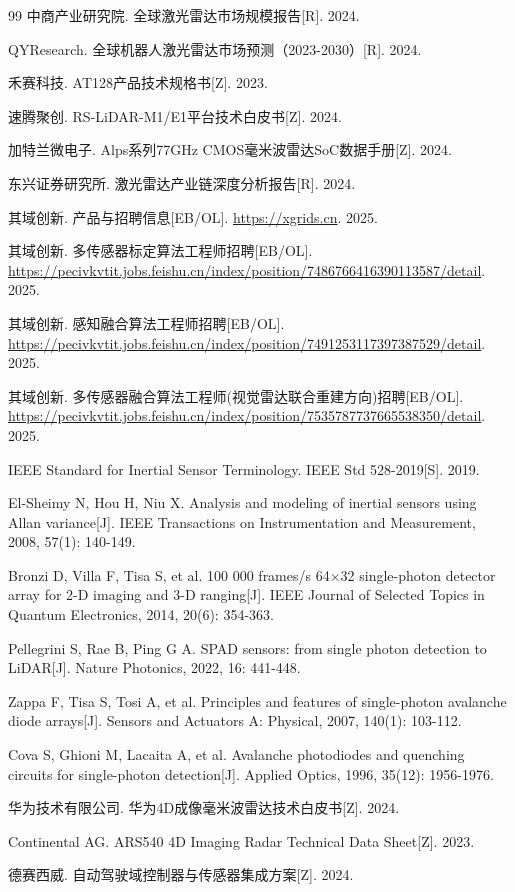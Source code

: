 \documentclass[12pt,a4paper,openany,UTF8]{ctexbook}
\begin{document}
\begin{thebibliography}{99}
 中商产业研究院. 全球激光雷达市场规模报告[R]. 2024.

 QYResearch. 全球机器人激光雷达市场预测（2023-2030）[R]. 2024.

 禾赛科技. AT128产品技术规格书[Z]. 2023.

 速腾聚创. RS-LiDAR-M1/E1平台技术白皮书[Z]. 2024.

 加特兰微电子. Alps系列77GHz CMOS毫米波雷达SoC数据手册[Z]. 2024.

 东兴证券研究所. 激光雷达产业链深度分析报告[R]. 2024.

 其域创新. 产品与招聘信息[EB/OL]. \url{https://xgrids.cn}. 2025.

 其域创新. 多传感器标定算法工程师招聘[EB/OL]. \url{https://pecivkvtit.jobs.feishu.cn/index/position/7486766416390113587/detail}. 2025.

 其域创新. 感知融合算法工程师招聘[EB/OL]. \url{https://pecivkvtit.jobs.feishu.cn/index/position/7491253117397387529/detail}. 2025.

 其域创新. 多传感器融合算法工程师(视觉雷达联合重建方向)招聘[EB/OL]. \url{https://pecivkvtit.jobs.feishu.cn/index/position/7535787737665538350/detail}. 2025.

 IEEE Standard for Inertial Sensor Terminology. IEEE Std 528-2019[S]. 2019.

 El-Sheimy N, Hou H, Niu X. Analysis and modeling of inertial sensors using Allan variance[J]. IEEE Transactions on Instrumentation and Measurement, 2008, 57(1): 140-149.

 Bronzi D, Villa F, Tisa S, et al. 100 000 frames/s 64$\times$32 single-photon detector array for 2-D imaging and 3-D ranging[J]. IEEE Journal of Selected Topics in Quantum Electronics, 2014, 20(6): 354-363.

 Pellegrini S, Rae B, Ping G A. SPAD sensors: from single photon detection to LiDAR[J]. Nature Photonics, 2022, 16: 441-448.

 Zappa F, Tisa S, Tosi A, et al. Principles and features of single-photon avalanche diode arrays[J]. Sensors and Actuators A: Physical, 2007, 140(1): 103-112.

 Cova S, Ghioni M, Lacaita A, et al. Avalanche photodiodes and quenching circuits for single-photon detection[J]. Applied Optics, 1996, 35(12): 1956-1976.

 华为技术有限公司. 华为4D成像毫米波雷达技术白皮书[Z]. 2024.

 Continental AG. ARS540 4D Imaging Radar Technical Data Sheet[Z]. 2023.

 德赛西威. 自动驾驶域控制器与传感器集成方案[Z]. 2024.

\end{thebibliography}
\end{document}
